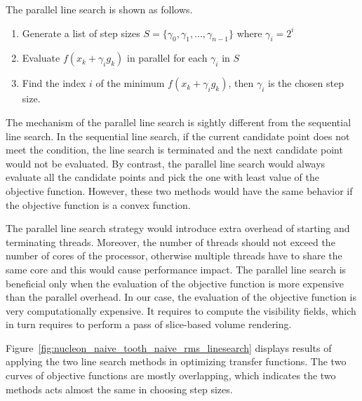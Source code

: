 The parallel line search is shown as follows.

\begin{enumerate}
	\item Generate a list of step sizes $ S= \{ \gamma_{0},\gamma_{1},...,\gamma_{n-1} \} $ where $ \gamma_{i}=2^{i} $
	\item Evaluate $ f(x_{k}+\gamma_{i} g_{k}) $ in parallel for each $ \gamma_{i} $ in $ S $
	\item Find the index $ i $ of the minimum $ f(x_{k}+\gamma_{i} g_{k}) $, then $ \gamma_{i} $ is the chosen step size.
\end{enumerate}

The mechanism of the parallel line search is sightly different from the sequential line search. In the sequential line search, if the current candidate point does not meet the condition, the line search is terminated and the next candidate point would not be evaluated. By contrast, the parallel line search would always evaluate all the candidate points and pick the one with least value of the objective function. However, these two methods would have the same behavior if the objective function is a convex function.

The parallel line search strategy would introduce extra overhead of starting and terminating threads. Moreover, the number of threads should not exceed the number of cores of the processor, otherwise multiple threads have to share the same core and this would cause performance impact. The parallel line search is beneficial only when the evaluation of the objective function is more expensive than the parallel overhead.
In our case, the evaluation of the objective function is very computationally expensive. It requires to compute the visibility fields, which in turn requires to perform a pass of slice-based volume rendering.

Figure~\ref{fig:nucleon_naive_tooth_naive_rms_linesearch} displays results of applying the two line search methods in optimizing transfer functions. The two curves of objective functions are mostly overlapping, which indicates the two methods acts almost the same in choosing step sizes.

